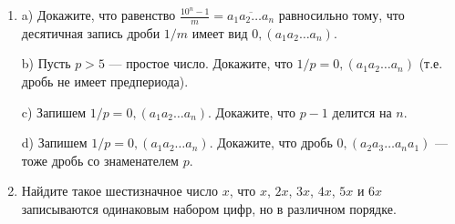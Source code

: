 \documentclass{article}
\begin{document}
\begin{enumerate}[label*=\protect\fbox{\arabic{enumi}}]
\item 
a) Докажите, что равенство $\frac{10^n-1}{m}=\overline{a_1a_2\dots a_n}$ равносильно тому, что десятичная запись дроби $1/m$ имеет вид $0,(a_1a_2\dots a_n)$.

b) Пусть $p>5$ --- простое число.  Докажите, что $1/p=0,(a_1a_2\dots a_n)$ (т.е. дробь не имеет предпериода).

c) Запишем $1/p=0,(a_1a_2\dots a_n)$. Докажите, что $p-1$ делится на $n$.

d) Запишем $1/p=0,(a_1a_2\dots a_n)$. Докажите, что дробь $0,(a_2a_3\dots a_na_1)$ --- тоже дробь со знаменателем $p$.

\item Найдите такое шестизначное число $x$, что $x$, $2x$, $3x$, $4x$, $5x$ и $6x$ записываются одинаковым набором цифр, но в различном порядке.

\end{enumerate}
\end{document}
